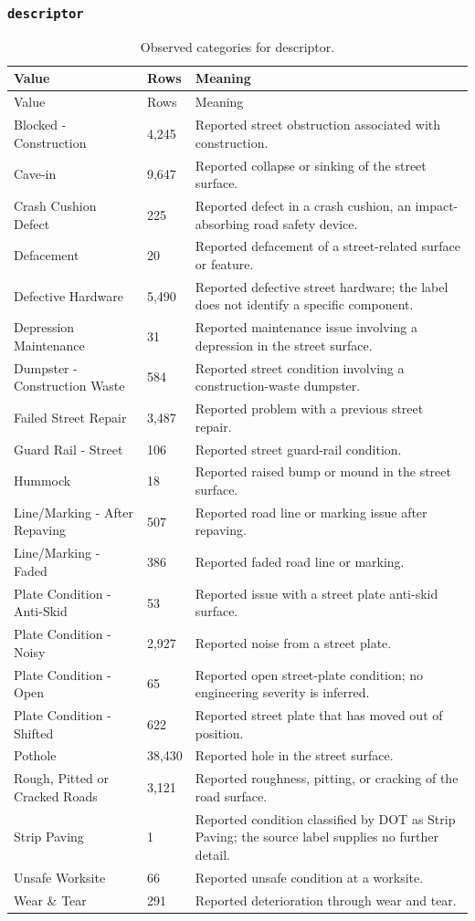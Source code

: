 \subsubsection*{\texttt{descriptor}}
\begin{longtable}{@{}p{.32\linewidth}p{.09\linewidth}p{.53\linewidth}@{}}
\caption{Observed categories for descriptor.}\\
\toprule Value & Rows & Meaning\\\midrule\endfirsthead
\toprule Value & Rows & Meaning\\\midrule\endhead
\bottomrule\endfoot
Blocked - Construction & 4,245 & Reported street obstruction associated with construction.\\
Cave-in & 9,647 & Reported collapse or sinking of the street surface.\\
Crash Cushion Defect & 225 & Reported defect in a crash cushion, an impact-absorbing road safety device.\\
Defacement & 20 & Reported defacement of a street-related surface or feature.\\
Defective Hardware & 5,490 & Reported defective street hardware; the label does not identify a specific component.\\
Depression Maintenance & 31 & Reported maintenance issue involving a depression in the street surface.\\
Dumpster - Construction Waste & 584 & Reported street condition involving a construction-waste dumpster.\\
Failed Street Repair & 3,487 & Reported problem with a previous street repair.\\
Guard Rail - Street & 106 & Reported street guard-rail condition.\\
Hummock & 18 & Reported raised bump or mound in the street surface.\\
Line/Marking - After Repaving & 507 & Reported road line or marking issue after repaving.\\
Line/Marking - Faded & 386 & Reported faded road line or marking.\\
Plate Condition - Anti-Skid & 53 & Reported issue with a street plate anti-skid surface.\\
Plate Condition - Noisy & 2,927 & Reported noise from a street plate.\\
Plate Condition - Open & 65 & Reported open street-plate condition; no engineering severity is inferred.\\
Plate Condition - Shifted & 622 & Reported street plate that has moved out of position.\\
Pothole & 38,430 & Reported hole in the street surface.\\
Rough, Pitted or Cracked Roads & 3,121 & Reported roughness, pitting, or cracking of the road surface.\\
Strip Paving & 1 & Reported condition classified by DOT as Strip Paving; the source label supplies no further detail.\\
Unsafe Worksite & 66 & Reported unsafe condition at a worksite.\\
Wear \& Tear & 291 & Reported deterioration through wear and tear.\\
\end{longtable}
